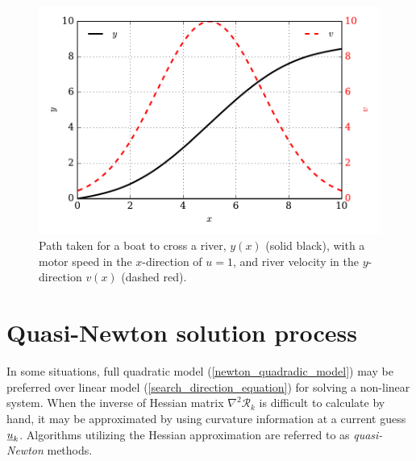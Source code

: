 \begin{figure}
  \centering
    \includegraphics[width=\linewidth]{images/fenics_intro/river_cross.pdf}
  \caption[Nonlinear problem example]{Path taken for a boat to cross a river, $y(x)$ (solid black), with a motor speed in the $x$-direction of $u = 1$, and river velocity in the $y$-direction $v(x)$ (dashed red).}
  \label{river_cross_image}
\end{figure}


\section{Quasi-Newton solution process}

In some situations, full quadratic model (\ref{newton_quadradic_model}) may be preferred over linear model (\ref{search_direction_equation}) for solving a non-linear system.  When the inverse of Hessian matrix $\nabla^2 \mathscr{R}_k$ is difficult to calculate by hand, it may be approximated by using curvature information at a current guess $\underline{u}_k$.  Algorithms utilizing the Hessian approximation are referred to as \emph{quasi-Newton} methods.

